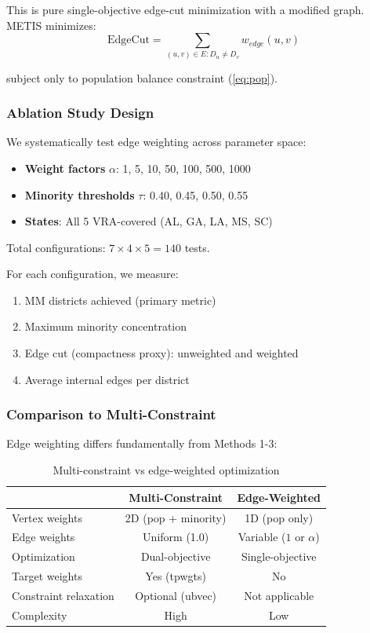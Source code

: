 This is pure single-objective edge-cut minimization with a modified graph. METIS minimizes:
\begin{equation}
\text{EdgeCut} = \sum_{(u,v) \in E : D_u \neq D_v} w_{edge}(u, v)
\end{equation}

subject only to population balance constraint (\ref{eq:pop}).

\subsubsection{Ablation Study Design}

We systematically test edge weighting across parameter space:
\begin{itemize}
\item \textbf{Weight factors} $\alpha$: 1, 5, 10, 50, 100, 500, 1000
\item \textbf{Minority thresholds} $\tau$: 0.40, 0.45, 0.50, 0.55
\item \textbf{States}: All 5 VRA-covered (AL, GA, LA, MS, SC)
\end{itemize}

Total configurations: $7 \times 4 \times 5 = 140$ tests.

For each configuration, we measure:
\begin{enumerate}
\item MM districts achieved (primary metric)
\item Maximum minority concentration
\item Edge cut (compactness proxy): unweighted and weighted
\item Average internal edges per district
\end{enumerate}

\subsubsection{Comparison to Multi-Constraint}

Edge weighting differs fundamentally from Methods 1-3:

\begin{table}[h]
\centering
\small
\begin{tabular}{lcc}
\toprule
& Multi-Constraint & Edge-Weighted \\
\midrule
Vertex weights & 2D (pop + minority) & 1D (pop only) \\
Edge weights & Uniform (1.0) & Variable ($1$ or $\alpha$) \\
Optimization & Dual-objective & Single-objective \\
Target weights & Yes (tpwgts) & No \\
Constraint relaxation & Optional (ubvec) & Not applicable \\
Complexity & High & Low \\
\bottomrule
\end{tabular}
\caption{Multi-constraint vs edge-weighted optimization}
\label{tab:method_comparison}
\end{table}

